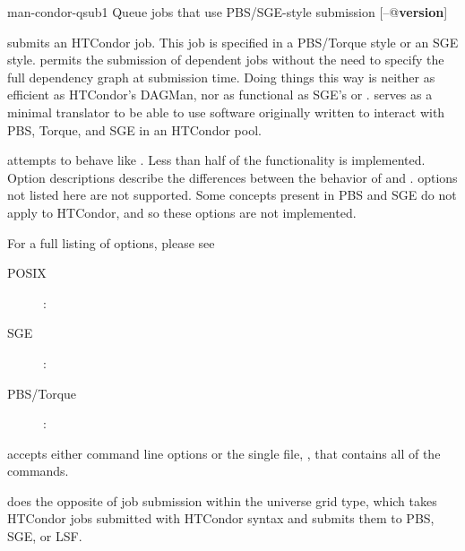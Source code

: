 \begin{ManPage}{}{man-condor-qsub}{1}
{Queue jobs that use PBS/SGE-style submission}
\Synopsis {}
[\verb@--@\textbf{version}]


\Description

 submits an HTCondor job.
This job is specified in a PBS/Torque style or an SGE style.
 permits the 
submission of dependent jobs without the need to specify the full
dependency graph at submission time.
Doing things this way is neither as efficient
as HTCondor's DAGMan, nor as functional as SGE's  or .
 serves as a minimal translator to be able to use 
software originally written to interact 
with PBS, Torque, and SGE in an HTCondor pool. 

 attempts to behave like . 
Less than half of the 
functionality is implemented. 
Option descriptions 
describe the differences between the behavior of  and 
.
 options not listed here are not supported.
Some concepts present in PBS and SGE do not apply to HTCondor,
and so these options are not implemented.

For a full listing of  options, please see
\begin{description}
\item[POSIX]: 
\item[SGE]: 
\item[PBS/Torque]: 
\end{description}

 accepts
either command line options or the single file, ,
that contains all of the commands. 

 does the opposite of job submission within the 
 universe 
 grid type,
which takes HTCondor jobs submitted with HTCondor
syntax and submits them to PBS, SGE, or LSF.


\end{ManPage}
